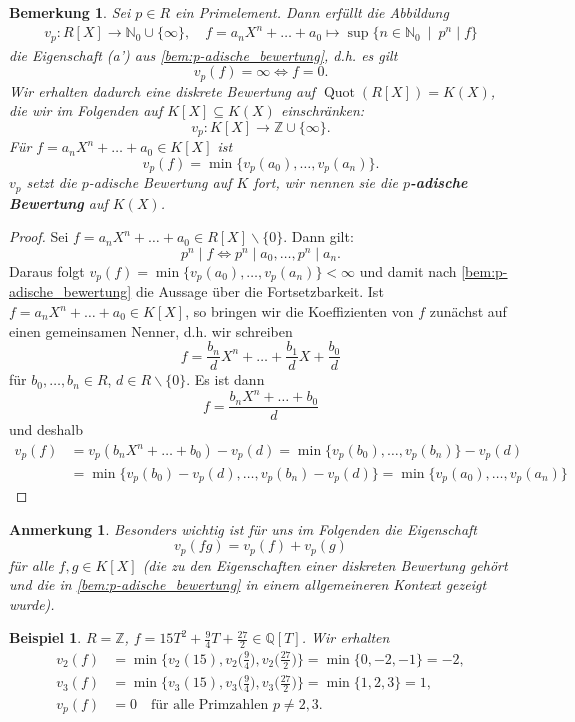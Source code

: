 \documentclass[a4paper, twoside, 11pt, ngerman]{report}
\newcommand{\NN}{\mathds N}
\newcommand{\QQ}{\mathds Q}
\newcommand{\ZZ}{\mathds Z}
\renewcommand{\setminus}{\smallsetminus}
\DeclareMathOperator{\Quot}{Quot}
\theoremstyle{definistyle}
\newtheorem{bem}[satz]{Bemerkung}
\newtheorem{anm}[satz]{Anmerkung}
\newtheorem{bsp}[satz]{Beispiel}
\theoremstyle{remark}
\newcommand{\defn}[1]{\textit{\bfseries #1}}
\begin{document}
\begin{bem}\label{bem:diskrete_bewertung_polynome}
Sei $p \in R$ ein Primelement. Dann erfüllt die Abbildung
\begin{align*}
v_p\colon R[X]\to\NN_0\cup\{\infty\}, \quad f = a_n X^n + \ldots + a_0 \mapsto \sup \{ n \in \NN_0 \ \mid \ p^n \mid f \}
\end{align*}
die Eigenschaft (a') aus \ref{bem:p-adische_bewertung}, d.h. es gilt \[v_p(f) = \infty \iff f = 0.\]
Wir erhalten dadurch eine diskrete Bewertung auf $\Quot(R[X]) = K(X)$, die wir im Folgenden auf $K[X]\subseteq K(X)$ einschränken:
\[
v_p \colon K[X] \to \ZZ \cup \{\infty\}.
\]
Für $f = a_n X^n + \ldots + a_0 \in K[X]$ ist
\[
v_p(f) = \min \{ v_p(a_0), \ldots, v_p(a_n) \}.
\]
$v_p$ setzt die $p$-adische Bewertung auf $K$ fort, wir nennen sie die \defn{$p$-adische Bewertung} auf $K(X)$.
\end{bem}

\begin{proof}
Sei $f = a_n X^n + \ldots + a_0 \in R[X] \setminus \{0\}$. Dann gilt:
\[
p^n \mid f \iff p^n \mid a_0, \ldots, p^n \mid a_n.
\]
Daraus folgt $v_p(f) = \min \{ v_p(a_0), \ldots, v_p(a_n) \} < \infty$ und damit nach \ref{bem:p-adische_bewertung} die
Aussage über die Fortsetzbarkeit.
Ist $f=a_nX^n+\ldots+a_0\in K[X]$, so bringen wir die Koeffizienten von $f$ zunächst auf einen gemeinsamen Nenner, d.h. wir schreiben
\[
f=\frac{b_n}{d}X^n+\ldots+\frac{b_1}{d}X+\frac{b_0}{d}
\]
für $b_0,\ldots,b_n\in R$, $d\in R\setminus\{0\}$. Es ist dann
\[
f=\frac{b_n X^n + \ldots + b_0}{d}
\]
und deshalb
\begin{align*}
v_p(f)&=v_p(b_n X^n + \ldots + b_0)-v_p(d)= \min \{ v_p(b_0), \ldots, v_p(b_n) \} -v_p(d) \\
&= \min \{ v_p(b_0)-v_p(d), \ldots, v_p(b_n)-v_p(d) \} = \min \{ v_p(a_0), \ldots, v_p(a_n) \}
\end{align*}
\end{proof}

\begin{anm}
Besonders wichtig ist für uns im Folgenden die Eigenschaft
\[
v_p(fg)=v_p(f)+v_p(g)
\]
für alle $f,g\in K[X]$ (die zu den Eigenschaften einer diskreten Bewertung gehört und die in \ref{bem:p-adische_bewertung} in einem allgemeineren Kontext gezeigt wurde).   
\end{anm}

\begin{bsp}\label{bsp:bewertung_polynome}
$R = \ZZ$, $f = 15 T^2 + \frac{9}{4} T + \frac{27}{2} \in \QQ[T]$. Wir erhalten
\begin{align*}
v_2(f) &= \min \big\{ v_2(15), v_2\big(\frac{9}{ 4}\big), v_2\big(\frac{27}{2}\big) \big\} = \min \{0, -2, -1\} = -2,\\
v_3(f) &= \min \big\{ v_3(15), v_3\big(\frac{9}{4}\big), v_3\big(\frac{27}{2}\big) \big\} = \min \{1, 2, 3\} = 1,\\
v_p(f) &= 0 \quad \text{für alle Primzahlen } p \neq 2,3.
\end{align*}
\end{bsp}
\end{document}
